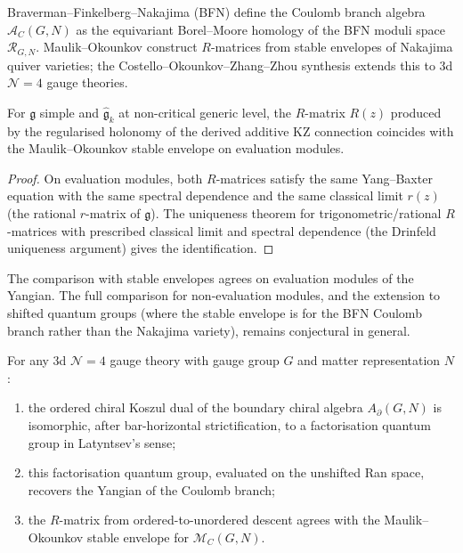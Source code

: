 Braverman--Finkelberg--Nakajima (BFN) define the Coulomb branch algebra
$\mathcal{A}_C(G,N)$ as the equivariant Borel--Moore homology of the BFN
moduli space $\mathcal{R}_{G,N}$. Maulik--Okounkov construct $R$-matrices
from stable envelopes of Nakajima quiver varieties; the
Costello--Okounkov--Zhang--Zhou synthesis extends this to 3d
$\mathcal{N}=4$ gauge theories.

\begin{proposition}
\label{prop:r-matrix-stable-envelope}
For $\mathfrak{g}$ simple and $\widehat{\mathfrak{g}}_k$ at
non-critical generic level, the $R$-matrix $R(z)$ produced by the
regularised holonomy of the derived additive KZ connection coincides
with the Maulik--Okounkov stable envelope on evaluation modules.
\end{proposition}

\begin{proof}
On evaluation modules, both $R$-matrices satisfy the same
Yang--Baxter equation with the same spectral dependence and the
same classical limit $r(z)$ (the rational $r$-matrix of
$\mathfrak{g}$). The uniqueness theorem for trigonometric/rational
$R$-matrices with prescribed classical limit and spectral dependence
(the Drinfeld uniqueness argument) gives the identification.
\end{proof}

\begin{remark}
The comparison with stable envelopes agrees on evaluation modules
of the Yangian. The full comparison for non-evaluation modules,
and the extension to shifted quantum groups (where the stable
envelope is for the BFN Coulomb branch rather than the Nakajima
variety), remains conjectural in general.
\end{remark}

\begin{conjecture}
\ClaimStatusConjectured
\label{conj:three-language-equivalence}
For any 3d $\mathcal{N}=4$ gauge theory with gauge group $G$ and
matter representation $N$:
\begin{enumerate}[label=\textup{(\alph*)}]
\item the ordered chiral Koszul dual of the boundary chiral algebra
 $A_{\partial}(G,N)$ is isomorphic, after bar-horizontal
 strictification, to a factorisation quantum group in Latyntsev's sense;
\item this factorisation quantum group, evaluated on the unshifted Ran
 space, recovers the Yangian of the Coulomb branch;
\item the $R$-matrix from ordered-to-unordered descent agrees with the
 Maulik--Okounkov stable envelope for $\mathcal{M}_C(G,N)$.
\end{enumerate}
\end{conjecture}

